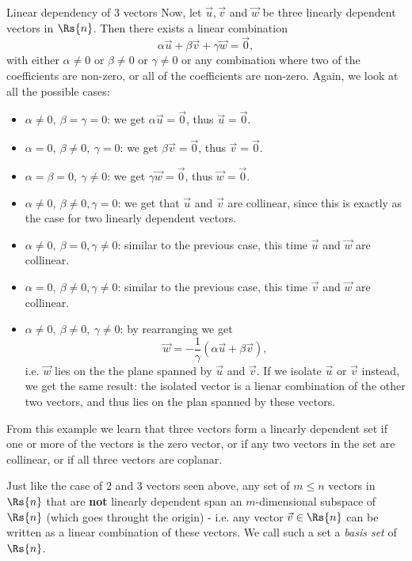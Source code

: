 \begin{example}{Linear dependency of $3$ vectors}{}
	Now, let $\vec{u},\vec{v}$ and $\vec{w}$ be three linearly dependent vectors in $\Rs{n}$. Then there exists a linear combination
	\[
		\alpha\vec{u} + \beta\vec{v} + \gamma\vec{w} = \vec{0},
	\]
	with either $\alpha\neq0$ or $\beta\neq0$ or $\gamma\neq0$ or any combination where two of the coefficients are non-zero, or all of the coefficients are non-zero. Again, we look at all the possible cases:
	\begin{itemize}
		\item $\alpha\neq0,\ \beta=\gamma=0$: we get $\alpha\vec{u} = \vec{0}$, thus $\vec{u}=\vec{0}$.
		\item $\alpha=0,\ \beta\neq0,\ \gamma=0$: we get $\beta\vec{v} = \vec{0}$, thus $\vec{v}=\vec{0}$.
		\item $\alpha=\beta=0,\ \gamma\neq0$: we get $\gamma\vec{w} = \vec{0}$, thus $\vec{w}=\vec{0}$.
		\item $\alpha\neq0,\ \beta\neq0, \gamma=0$: we get that $\vec{u}$ and $\vec{v}$ are collinear, since this is exactly as the case for two linearly dependent vectors.
		\item $\alpha\neq0,\ \beta=0, \gamma\neq0$: similar to the previous case, this time $\vec{u}$ and $\vec{w}$ are collinear.
		\item $\alpha=0,\ \beta\neq0, \gamma\neq0$: similar to the previous case, this time $\vec{v}$ and $\vec{w}$ are collinear.
		\item $\alpha\neq0,\ \beta\neq0,\ \gamma\neq0$: by rearranging we get
			\[
				\vec{w} = -\frac{1}{\gamma}\left( \alpha\vec{u} + \beta\vec{v} \right),
			\]
			i.e. $\vec{w}$ lies on the the plane spanned by $\vec{u}$ and $\vec{v}$. If we isolate $\vec{u}$ or $\vec{v}$ instead, we get the same result: the isolated vector is a lienar combination of the other two vectors, and thus lies on the plan spanned by these vectors.
	\end{itemize}
	From this example we learn that three vectors form a linearly dependent set if one or more of the vectors is the zero vector, or if any two vectors in the set are collinear, or if all three vectors are coplanar.
\end{example}

Just like the case of $2$ and $3$ vectors seen above, any set of $m\leq n$ vectors in $\Rs{n}$ that are \textbf{not} linearly dependent span an $m$-dimensional subspace of $\Rs{n}$ (which goes throught the origin) - i.e. any vector $\vec{v}\in\Rs{n}$ can be written as a linear combination of these vectors. We call such a set a \emph{basis set} of $\Rs{n}$.

